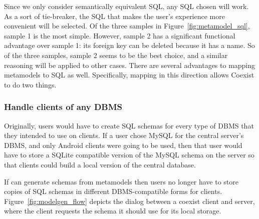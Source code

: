 Since we only consider semantically equivalent SQL, any SQL chosen will work.
As a sort of tie-breaker, the SQL that makes the user's experience more
convenient will be selected. Of the three samples in Figure~\ref{fig:metamodel_sql},
sample 1 is the most simple. However, sample 2 has a significant functional advantage
over sample 1: its foreign key can be deleted because it has a name. So of the
three samples, sample 2 seems to be the best choice, and a similar reasoning
will be applied to other cases. There are several advantages to mapping
metamodels to SQL as well. Specifically, mapping in this direction allows
Coexist to do two things.


\setcounter{subsubsection}{0}
\subsubsection{Handle clients of any DBMS} \label{sec:mm_advantage}

Originally, users would have to create SQL schemas for every type of DBMS that
they intended to use on clients. If a user chose MySQL for the central server's
DBMS, and only Android clients were going to be used, then that user would have
to store a SQLite compatible version of the MySQL schema on the server so that
clients could build a local version of the central database.

If  can generate schemas from metamodels then users no longer have to
store copies of SQL schemas in different DBMS-compatible forms for
clients. Figure~\ref{fig:modelgen_flow} depicts the dialog between a coexist
client and server, where the client requests the schema it should use for its
local storage.


